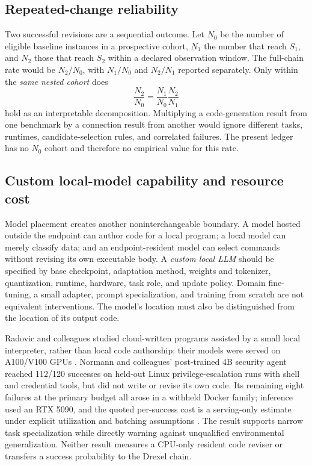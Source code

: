 \documentclass[11pt,letterpaper]{article}
\begin{document}
\subsection{Repeated-change reliability}

Two successful revisions are a sequential outcome. Let $N_0$ be the number of eligible baseline instances in a prospective cohort, $N_1$ the number that reach $S_1$, and $N_2$ those that reach $S_2$ within a declared observation window. The full-chain rate would be $N_2/N_0$, with $N_1/N_0$ and $N_2/N_1$ reported separately. Only within the \emph{same nested cohort} does
\begin{equation}
\frac{N_2}{N_0}=\frac{N_1}{N_0}\frac{N_2}{N_1}
\end{equation}
hold as an interpretable decomposition. Multiplying a code-generation result from one benchmark by a connection result from another would ignore different tasks, runtimes, candidate-selection rules, and correlated failures. The present ledger has no $N_0$ cohort and therefore no empirical value for this rate.

\subsection{Custom local-model capability and resource cost}

Model placement creates another noninterchangeable boundary. A model hosted outside the endpoint can author code for a local program; a local model can merely classify data; and an endpoint-resident model can select commands without revising its own executable body. A \emph{custom local LLM} should be specified by base checkpoint, adaptation method, weights and tokenizer, quantization, runtime, hardware, task role, and update policy. Domain fine-tuning, a small adapter, prompt specialization, and training from scratch are not equivalent interventions. The model's location must also be distinguished from the location of its output code.

Radovic and colleagues studied cloud-written programs assisted by a small local interpreter, rather than local code authorship; their models were served on A100/V100 GPUs \cite{radovic}. Normann and colleagues' post-trained 4B security agent reached 112/120 successes on held-out Linux privilege-escalation runs with shell and credential tools, but did not write or revise its own code. Its remaining eight failures at the primary budget all arose in a withheld Docker family; inference used an RTX 5090, and the quoted per-success cost is a serving-only estimate under explicit utilization and batching assumptions \cite{normann}. The result supports narrow task specialization while directly warning against unqualified environmental generalization. Neither result measures a CPU-only resident code reviser or transfers a success probability to the Drexel chain.
\end{document}
